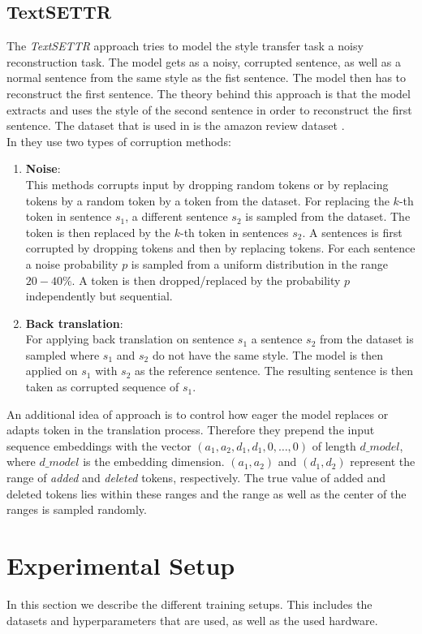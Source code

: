 \documentclass[twocolumn]{tum-article}
\begin{document}
\subsection{TextSETTR}
The \textit{TextSETTR} approach tries to model the style transfer task a noisy reconstruction task. The model gets as a noisy, corrupted sentence, as well as a normal sentence from the same style as the fist sentence. The model then has to reconstruct the first sentence. The theory behind this approach is that the model extracts and uses the style of the second sentence in order to reconstruct the first sentence. The dataset that is used in \cite{riley2020textsettr} is the amazon review dataset \cite{li2018delete}.\\
In \cite{riley2020textsettr} they use two types of corruption methods:
\begin{enumerate}
\item \textbf{Noise}:\\
This methods corrupts input by dropping random tokens or by replacing tokens by a random token by a token from the dataset. For replacing the $k$-th token in sentence $s_1$, a different sentence $s_2$ is sampled from the dataset. The token is then replaced by the $k$-th token in sentences $s_2$. A sentences is first corrupted by dropping tokens and then by replacing tokens. For each sentence a noise probability $p$ is sampled from a uniform distribution in the range $20-40\%$. A token is then dropped/replaced by the probability $p$ independently but sequential.
\item \textbf{Back translation}:\\
For applying back translation on sentence $s_1$ a sentence $s_2$ from the dataset is sampled where $s_1$ and $s_2$ do not have the same style. The model is then applied on $s_1$ with $s_2$ as the reference sentence. The resulting sentence is then taken as corrupted sequence of $s_1$. 
\end{enumerate}
An additional idea of \cite{riley2020textsettr} approach is to control how eager the model replaces or adapts token in the translation process. Therefore they prepend the input sequence embeddings with the vector $(a_1, a_2, d_1, d_1, 0, \dots, 0)$ of length $d\_model$, where $d\_model$ is the embedding dimension. $(a_1, a_2)$ and $(d_1, d_2)$ represent the range of \textit{added} and \textit{deleted} tokens, respectively. The true value of added and deleted tokens lies within these ranges and the range as well as the center of the ranges is sampled randomly.
\section{Experimental Setup}
In this section we describe the different training setups. This includes the datasets and hyperparameters that are used, as well as the used hardware.
\end{document}
